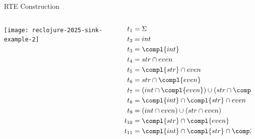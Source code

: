 \begin{frame}{RTE Construction}
  \begin{columns}
    \begin{column}{0.5\textwidth}
      \texttt{[image: reclojure-2025-sink-example-2]}
    \end{column}
    \begin{column}{0.5\textwidth}
      \begin{align*}
        t_1 &= \Sigma\\
        t_2 &= int  \\
        t_3 &= \compl{int}\\
        t_4 &= str \cap even\\
        t_5 &= \compl{str} \cap even\\
        t_6 &= str \cap \compl{even}\\
        t_7 &= (int \cap \compl{even}) \cup (str \cap \compl{even})\\
        t_8 &=\compl{int} \cap \compl{str} \cap even\\
        t_9 &=(int \cap even) \cup (str \cap even)\\
        t_{10} &=\compl{str} \cap \compl{even}\\
        t_{11} &=\compl{int} \cap \compl{str} \cap \compl{even}
      \end{align*}
    \end{column}
  \end{columns}
\end{frame}


